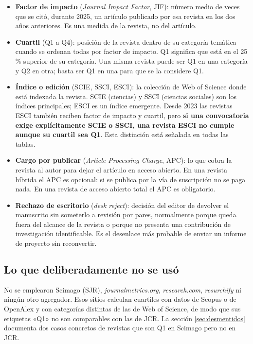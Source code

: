 \documentclass[11pt,a4paper]{article}
\begin{document}
\begin{itemize}[leftmargin=*,itemsep=4pt]
	\item \textbf{Factor de impacto} (\emph{Journal Impact Factor}, JIF): número medio de veces que se citó, durante 2025, un artículo publicado por esa revista en los dos años anteriores. Es una medida de la revista, no del artículo.
	\item \textbf{Cuartil} (Q1 a Q4): posición de la revista dentro de su categoría temática cuando se ordenan todas por factor de impacto. Q1 significa que está en el 25\,\% superior de su categoría. Una misma revista puede ser Q1 en una categoría y Q2 en otra; basta ser Q1 en una para que se la considere Q1.
	\item \textbf{Índice o edición} (SCIE, SSCI, ESCI): la colección de Web of Science donde está indexada la revista. SCIE (ciencias) y SSCI (ciencias sociales) son los índices principales; ESCI es un índice emergente. Desde 2023 las revistas ESCI también reciben factor de impacto y cuartil, pero \textbf{si una convocatoria exige explícitamente SCIE o SSCI, una revista ESCI no cumple aunque su cuartil sea Q1}. Esta distinción está señalada en todas las tablas.
	\item \textbf{Cargo por publicar} (\emph{Article Processing Charge}, APC): lo que cobra la revista al autor para dejar el artículo en acceso abierto. En una revista híbrida el APC es opcional: si se publica por la vía de suscripción no se paga nada. En una revista de acceso abierto total el APC es obligatorio.
	\item \textbf{Rechazo de escritorio} (\emph{desk reject}): decisión del editor de devolver el manuscrito sin someterlo a revisión por pares, normalmente porque queda fuera del alcance de la revista o porque no presenta una contribución de investigación identificable. Es el desenlace más probable de enviar un informe de proyecto sin reconvertir.
\end{itemize}

\subsection{Lo que deliberadamente no se usó}

No se emplearon Scimago (SJR), \emph{journalmetrics.org}, \emph{research.com}, \emph{resurchify} ni ningún otro agregador. Esos sitios calculan cuartiles con datos de Scopus o de OpenAlex y con categorías distintas de las de Web of Science, de modo que sus etiquetas «Q1» no son comparables con las de JCR. La sección \ref{sec:desmentidos} documenta dos casos concretos de revistas que son Q1 en Scimago pero no en JCR.
\end{document}
